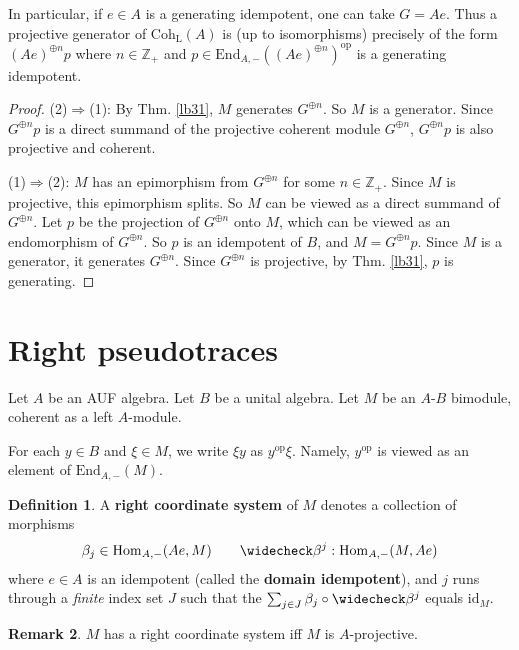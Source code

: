 \documentclass[11pt,b5paper,notitlepage]{article}
\theoremstyle{definition}
\newtheorem{df}{Definition}[section]
\newtheorem{rem}[df]{Remark}
\theoremstyle{plain}
\newcommand{\wch}{\widecheck}
\newcommand{\End}{\mathrm{End}} %
\newcommand{\id}{\mathrm{id}}
\newcommand{\Hom}{\mathrm{Hom}}
\newcommand{\opp}{\mathrm{op}}
\newcommand{\Zbb}{\mathbb Z}
\newcommand{\Coh}{\mathrm{Coh}_{\mathrm L}}
\numberwithin{equation}{section}
\begin{document}
In particular, if $e\in A$ is a generating idempotent, one can take $G=Ae$. Thus a projective generator of $\Coh(A)$ is (up to isomorphisms) precisely of the form $(Ae)^{\oplus n}p$ where $n\in\Zbb_+$ and $p\in \End_{A,-}((Ae)^{\oplus n})^\opp$
is a generating idempotent.

\begin{proof}
(2)$\Rightarrow$(1): By Thm. \ref{lb31}, $M$ generates $G^{\oplus n}$. So $M$ is a generator. Since $G^{\oplus n}p$ is a direct summand of the projective coherent module $G^{\oplus n}$, $G^{\oplus n}p$ is also projective and coherent.

(1)$\Rightarrow$(2): $M$ has an epimorphism from $G^{\oplus n}$ for some $n\in\Zbb_+$. Since $M$ is projective, this epimorphism splits. So $M$ can be viewed as a direct summand of $G^{\oplus n}$. Let $p$ be the projection of $G^{\oplus n}$ onto $M$, which can be viewed as an endomorphism of $G^{\oplus n}$. So $p$ is an idempotent of $B$, and $M=G^{\oplus n}p$. Since $M$ is a generator, it generates $G^{\oplus n}$. Since $G^{\oplus n}$ is projective, by Thm. \ref{lb31}, $p$ is generating.
\end{proof}










\section{Right pseudotraces}


Let $A$ be an AUF algebra. Let $B$ be a unital algebra. Let $M$ be an $A$-$B$ bimodule, coherent as a left $A$-module. 

For each $y\in B$ and $\xi\in M$, we write $\xi y$ as $y^\opp \xi$. Namely, $y^\opp$ is viewed as an element of $\End_{A,-}(M)$.

\begin{df}\label{lb36}
A \textbf{right coordinate system} of $M$ denotes a collection of morphisms
\begin{align*}
\beta_j\in\Hom_{A,-}(Ae,M)\qquad \wch\beta^j:\Hom_{A,-}(M,Ae)
\end{align*}
where $e\in A$ is an idempotent (called the \textbf{domain idempotent}), and $j$ runs through a \textit{finite} index set $J$ such that the $\sum_{j\in J}\beta_j\circ\wch\beta^j$ equals $\id_M$.
\end{df}


\begin{rem}\label{lb38}
	$M$ has a right coordinate system iff $M$ is $A$-projective.
\end{rem}
\end{document}
